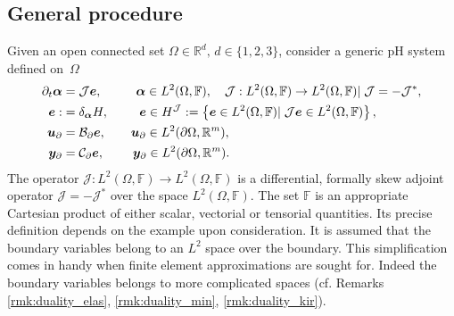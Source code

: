 \subsection{General procedure}\label{sec:pfem_gen}
Given an open connected set $\Omega \in \mathbb{R}^d,\, d \in  \{1,2,3\}$, consider a generic pH system defined on~$\Omega$
\begin{subequations}
\label{eq:pHsys_2}
\begin{align}
\partial_t {\bm{\alpha}} &= \mathcal{J}\displaystyle \bm{e}, \qquad \;\;\, \bm{\alpha} \in L^2(\Omega, \mathbb{F}), \quad \mathcal{J}: L^2(\Omega, \mathbb{F}) \rightarrow L^2(\Omega, \mathbb{F}) \vert \;  \mathcal{J} = - \mathcal{J}^*, \label{eq:pHsys_dyn} \vspace{3pt}\\
\bm{e} :&= \displaystyle \delta_{\bm{\alpha}}H, \qquad \;\, \bm{e} \in H^\mathcal{J} :=\left\{\bm{e} \in L^2(\Omega, \mathbb{F}) \vert \; \mathcal{J}\bm{e} \in L^2(\Omega, \mathbb{F})  \right\}, \label{eq:pHsys_const} \\
\bm{u}_\partial &= \mathcal{B}_\partial  \displaystyle \bm{e}, \qquad \bm{u}_\partial \in L^2(\partial\Omega, \mathbb{R}^m), \label{eq:pHsys_u} \vspace{3pt}\\
\bm{y}_\partial &= \mathcal{C}_\partial \displaystyle \bm{e}, \qquad \; \bm{y}_\partial \in L^2(\partial\Omega, \mathbb{R}^m). \label{eq:pHsys_y} \vspace{3pt}
\end{align}
\end{subequations}
The operator $\mathcal{J}: L^2(\Omega, \mathbb{F}) \rightarrow L^2(\Omega, \mathbb{F})$ is a differential, formally skew adjoint operator $\mathcal{J} = - \mathcal{J}^*$ over the space $L^2(\Omega, \mathbb{F})$. The  set $\mathbb{F}$ is an appropriate Cartesian product of either scalar, vectorial or tensorial quantities. Its precise definition depends on the example upon consideration. It is assumed that the boundary variables belong to an $L^2$ space over the boundary. This simplification comes in handy when finite element approximations are sought for. Indeed the boundary variables belongs to more complicated spaces (cf. Remarks \ref{rmk:duality_elas}, \ref{rmk:duality_min}, \ref{rmk:duality_kir}).  \\

